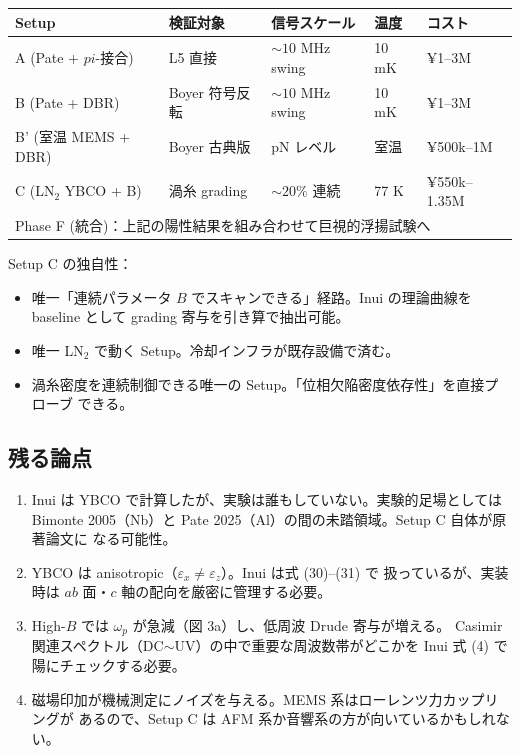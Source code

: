 \documentclass[11pt,a4paper]{article}
\def\pi{pi}%
\def\textbf#1{#1}%
\begin{document}
\begin{center}
\renewcommand{\arraystretch}{1.2}
\begin{tabular}{p{}p{}p{}p{}p{}}
\toprule
Setup & 検証対象 & 信号スケール & 温度 & コスト \\
\midrule
A (Pate + $\pi$-接合) & L5 直接 & $\sim 10$ MHz swing & 10 mK & ¥1--3M \\
B (Pate + DBR)        & Boyer 符号反転 & $\sim 10$ MHz swing & 10 mK & ¥1--3M \\
B' (室温 MEMS + DBR)  & Boyer 古典版 & pN レベル & 室温 & ¥500k--1M \\
\textbf{C (LN$_2$ YBCO + B)} & \textbf{渦糸 grading} & \textbf{$\sim 20\%$ 連続} & \textbf{77 K} & \textbf{¥550k--1.35M} \\
\midrule
\multicolumn{5}{l}{Phase F (統合)：上記の陽性結果を組み合わせて巨視的浮揚試験へ} \\
\bottomrule
\end{tabular}
\end{center}

\textbf{Setup C の独自性}：
\begin{itemize}
\item 唯一「連続パラメータ $B$ でスキャンできる」経路。Inui の理論曲線を baseline
  として grading 寄与を引き算で抽出可能。
\item 唯一 LN$_2$ で動く Setup。冷却インフラが既存設備で済む。
\item 渦糸密度を連続制御できる唯一の Setup。「位相欠陥密度依存性」を直接プローブ
  できる。
\end{itemize}

\subsection{残る論点}

\begin{enumerate}
\item Inui は YBCO で計算したが、\textbf{実験は誰もしていない}。実験的足場としては
  Bimonte 2005（Nb）と Pate 2025（Al）の間の未踏領域。Setup C 自体が原著論文に
  なる可能性。
\item YBCO は anisotropic（$\varepsilon_x \neq \varepsilon_z$）。Inui は式 (30)--(31) で
  扱っているが、実装時は $ab$ 面・$c$ 軸の配向を厳密に管理する必要。
\item High-$B$ では $\omega_p$ が急減（図 3a）し、低周波 Drude 寄与が増える。
  Casimir 関連スペクトル（DC$\sim$UV）の中で重要な周波数帯がどこかを
  Inui 式 (4) で陽にチェックする必要。
\item 磁場印加が機械測定にノイズを与える。MEMS 系はローレンツ力カップリングが
  あるので、Setup C は AFM 系か音響系の方が向いているかもしれない。
\end{enumerate}
\end{document}
